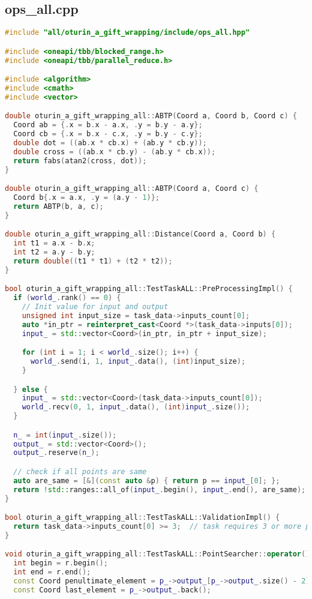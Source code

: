 \documentclass[12pt,a4paper]{extarticle}
\begin{document}
\subsection{ops\_all.cpp}
\label{sec:all.cpp}
\begin{lstlisting}[language=C++]
#include "all/oturin_a_gift_wrapping/include/ops_all.hpp"

#include <oneapi/tbb/blocked_range.h>
#include <oneapi/tbb/parallel_reduce.h>

#include <algorithm>
#include <cmath>
#include <vector>

double oturin_a_gift_wrapping_all::ABTP(Coord a, Coord b, Coord c) {
  Coord ab = {.x = b.x - a.x, .y = b.y - a.y};
  Coord cb = {.x = b.x - c.x, .y = b.y - c.y};
  double dot = ((ab.x * cb.x) + (ab.y * cb.y));
  double cross = ((ab.x * cb.y) - (ab.y * cb.x));
  return fabs(atan2(cross, dot));
}

double oturin_a_gift_wrapping_all::ABTP(Coord a, Coord c) {
  Coord b{.x = a.x, .y = (a.y - 1)};
  return ABTP(b, a, c);
}

double oturin_a_gift_wrapping_all::Distance(Coord a, Coord b) {
  int t1 = a.x - b.x;
  int t2 = a.y - b.y;
  return double((t1 * t1) + (t2 * t2));
}

bool oturin_a_gift_wrapping_all::TestTaskALL::PreProcessingImpl() {
  if (world_.rank() == 0) {
    // Init value for input and output
    unsigned int input_size = task_data->inputs_count[0];
    auto *in_ptr = reinterpret_cast<Coord *>(task_data->inputs[0]);
    input_ = std::vector<Coord>(in_ptr, in_ptr + input_size);

    for (int i = 1; i < world_.size(); i++) {
      world_.send(i, 1, input_.data(), (int)input_size);
    }

  } else {
    input_ = std::vector<Coord>(task_data->inputs_count[0]);
    world_.recv(0, 1, input_.data(), (int)input_.size());
  }

  n_ = int(input_.size());
  output_ = std::vector<Coord>();
  output_.reserve(n_);

  // check if all points are same
  auto are_same = [&](const auto &p) { return p == input_[0]; };
  return !std::ranges::all_of(input_.begin(), input_.end(), are_same);
}

bool oturin_a_gift_wrapping_all::TestTaskALL::ValidationImpl() {
  return task_data->inputs_count[0] >= 3;  // task requires 3 or more points to wrap
}

void oturin_a_gift_wrapping_all::TestTaskALL::PointSearcher::operator()(const tbb::blocked_range<int> &r) {
  int begin = r.begin();
  int end = r.end();
  const Coord penultimate_element = p_->output_[p_->output_.size() - 2];
  const Coord last_element = p_->output_.back();


\end{lstlisting}
\end{document}
